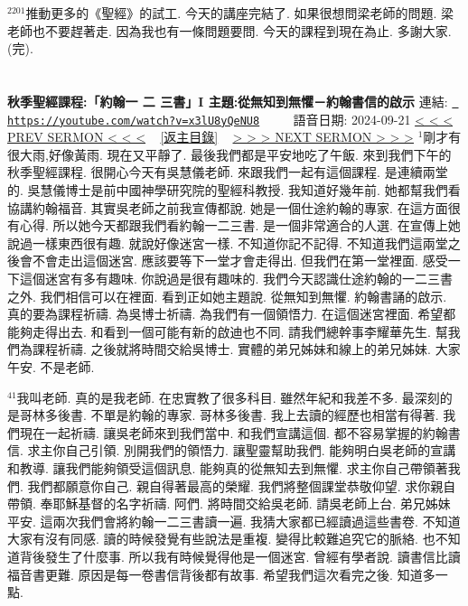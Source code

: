 \documentclass{book}
\begin{document}
$^{2201}$推動更多的《聖經》的試工.
今天的講座完結了.
如果很想問梁老師的問題.
梁老師也不要趕著走.
因為我也有一條問題要問.
今天的課程到現在為止.
多謝大家.
(完).
\newpage



\section{}
\label{sec:x3lU8yQeNU8}
\textbf{秋季聖經課程:「約翰一 二 三書」I 主題:從無知到無懼－約翰書信的啟示}
\newline
\newline
連結: \href{https://youtube.com/watch?v=x3lU8yQeNU8}{\texttt{ https://youtube.com/watch?v=x3lU8yQeNU8}} ~~~~ 語音日期: 2024-09-21 
\newline
\newline
\hyperref[sec:A6e_76MEqBA]{\small{< < < PREV SERMON < < <}}
~
\hyperref[sec:index]{\small{[返主目錄]}}
~
\hyperref[sec:sEvrhOW5UYA]{\small{> > > NEXT SERMON > > >}}
\newline
\newline
$^{1}$剛才有很大雨,好像黃雨.
現在又平靜了.
最後我們都是平安地吃了午飯.
來到我們下午的秋季聖經課程.
很開心今天有吳慧儀老師.
來跟我們一起有這個課程.
是連續兩堂的.
吳慧儀博士是前中國神學研究院的聖經科教授.
我知道好幾年前.
她都幫我們看協講約翰福音.
其實吳老師之前我宣傳都說.
她是一個仕途約翰的專家.
在這方面很有心得.
所以她今天都跟我們看約翰一二三書.
是一個非常適合的人選.
在宣傳上她說過一樣東西很有趣.
就說好像迷宮一樣.
不知道你記不記得.
不知道我們這兩堂之後會不會走出這個迷宮.
應該要等下一堂才會走得出.
但我們在第一堂裡面.
感受一下這個迷宮有多有趣味.
你說過是很有趣味的.
我們今天認識仕途約翰的一二三書之外.
我們相信可以在裡面.
看到正如她主題說.
從無知到無懼.
約翰書誦的啟示.
真的要為課程祈禱.
為吳博士祈禱.
為我們有一個領悟力.
在這個迷宮裡面.
希望都能夠走得出去.
和看到一個可能有新的啟迪也不同.
請我們總幹事李耀華先生.
幫我們為課程祈禱.
之後就將時間交給吳博士.
實體的弟兄姊妹和線上的弟兄姊妹.
大家午安.
不是老師.

$^{41}$我叫老師.
真的是我老師.
在忠實教了很多科目.
雖然年紀和我差不多.
最深刻的是哥林多後書.
不單是約翰的專家.
哥林多後書.
我上去讀的經歷也相當有得著.
我們現在一起祈禱.
讓吳老師來到我們當中.
和我們宣講這個.
都不容易掌握的約翰書信.
求主你自己引領.
別開我們的領悟力.
讓聖靈幫助我們.
能夠明白吳老師的宣講和教導.
讓我們能夠領受這個訊息.
能夠真的從無知去到無懼.
求主你自己帶領著我們.
我們都願意你自己.
親自得著最高的榮耀.
我們將整個課堂恭敬仰望.
求你親自帶領.
奉耶穌基督的名字祈禱.
阿們.
將時間交給吳老師.
請吳老師上台.
弟兄姊妹平安.
這兩次我們會將約翰一二三書讀一遍.
我猜大家都已經讀過這些書卷.
不知道大家有沒有同感.
讀的時候發覺有些說法是重複.
變得比較難追究它的脈絡.
也不知道背後發生了什麼事.
所以我有時候覺得他是一個迷宮.
曾經有學者說.
讀書信比讀福音書更難.
原因是每一卷書信背後都有故事.
希望我們這次看完之後.
知道多一點.
\end{document}
